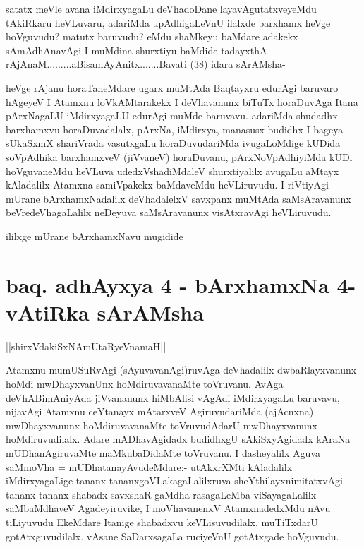 \begin{artha}
satatx meVle avana iMdirxyagaLu deVhadoDane layavAgutatxveyeMdu tAkiRkaru heVLuvaru, adariMda upAdhigaLeVnU ilalxde barxhamx heVge hoVguvudu? matutx baruvudu? eMdu shaMkeyu baMdare adakekx sAmAdhAnavAgi I muMdina shurxtiyu baMdide tadayxthA rAjAnaM.........aBisamAyAnitx.......Bavati (38) idara sArAMsha-
\end{artha}

\begin{artha}
heVge rAjanu horaTaneMdare ugarx muMtAda Baqtayxru edurAgi baruvaro hAgeyeV I Atamxnu loVkAMtarakekx I deVhavanunx biTuTx horaDuvAga Itana pArxNagaLU iMdirxyagaLU edurAgi muMde baruvavu. adariMda shudadhx barxhamxvu horaDuvadalalx, pArxNa, iMdirxya, manasusx budidhx I bageya sUkaSxmX shariVrada vasutxgaLu horaDuvudariMda ivugaLoMdige kUDida soVpAdhika barxhamxveV (jiVvaneV) horaDuvanu, pArxNoVpAdhiyiMda kUDi hoVguvaneMdu heVLuva udedxVshadiMdaleV shurxtiyalilx avugaLu aMtayx kAladalilx Atamxna samiVpakekx baMdaveMdu heVLiruvudu. I riVtiyAgi mUrane bArxhamxNadalilx deVhadalelxV savxpanx muMtAda saMsAravanunx beVredeVhagaLalilx neDeyuva saMsAravanunx visAtxravAgi heVLiruvudu.
\end{artha}

\begin{center}
ililxge mUrane bArxhamxNavu mugidide
\end{center}

\section*{baq. adhAyxya 4 - bArxhamxNa 4-vAtiRka sArAMsha}

\begin{center}
||shirxVdakiSxNAmUtaRyeVnamaH||
\end{center}


\begin{artha}
Atamxnu mumUSuRvAgi (sAyuvavanAgi)ruvAga deVhadalilx dwbaRlayxvanunx hoMdi mwDhayxvanUnx hoMdiruvavanaMte toVruvanu. AvAga deVhABimAniyAda jiVvananunx hiMbAlisi vAgAdi iMdirxyagaLu baruvavu, nijavAgi Atamxnu ceYtanayx mAtarxveV AgiruvudariMda (ajAcnxna) mwDhayxvanunx hoMdiruvavanaMte toVruvudAdarU mwDhayxvanunx hoMdiruvudilalx. Adare mADhavAgidadx budidhxgU sAkiSxyAgidadx kAraNa mUDhanAgiruvaMte maMkubaDidaMte toVruvanu. I dasheyalilx Aguva saMmoVha = mUDhatanayAvudeMdare:- utAkxrXMti kAladalilx iMdirxyagaLige tananx tananxgoVLakagaLalilxruva sheYthilayxnimitatxvAgi tananx tananx shabadx savxshaR gaMdha rasagaLeMba viSayagaLalilx saMbaMdhaveV Agadeyiruvike, I moVhavanenxV AtamxnadedxMdu nAvu tiLiyuvudu EkeMdare Itanige shabadxvu keVLisuvudilalx. muTiTxdarU gotAtxguvudilalx. vAsane SaDarxsagaLa ruciyeVnU gotAtxgade hoVguvudu.
\end{artha}

